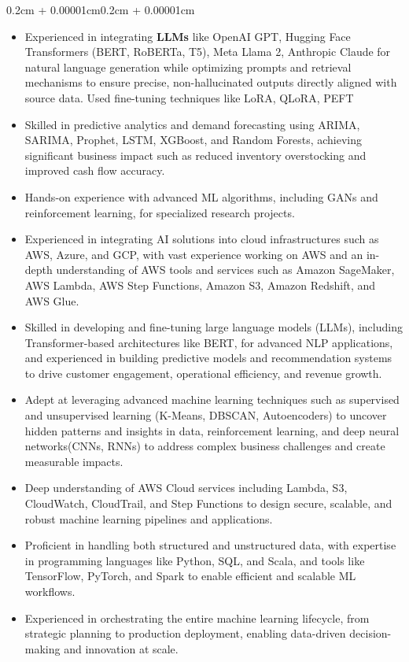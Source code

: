 \documentclass{article}
\newenvironment{highlights}{
    \begin{itemize}[
        topsep=0.10cm, 
        parsep=0.08cm, 
        partopsep=0pt, 
        itemsep=0.08cm, 
        leftmargin=0.4cm + 10pt
    ]
}{
    \end{itemize}
}
\newenvironment{onecolentry}{
    \begin{adjustwidth}{0.2cm + 0.00001cm}{0.2cm + 0.00001cm}
}{
    \end{adjustwidth}
}
\begin{document}
\begin{onecolentry}
\begin{highlights}
        \item Experienced in integrating \textbf{LLMs} like OpenAI GPT, Hugging Face Transformers (BERT, RoBERTa, T5), Meta Llama 2, Anthropic Claude for natural language generation while optimizing prompts and retrieval mechanisms to ensure precise, non-hallucinated outputs directly aligned with source data. Used fine-tuning techniques like LoRA, QLoRA, PEFT
        \item Skilled in predictive analytics and demand forecasting using ARIMA, SARIMA, Prophet, LSTM, XGBoost, and Random Forests, achieving significant business impact such as reduced inventory overstocking and improved cash flow accuracy.
        \item Hands-on experience with advanced ML algorithms, including GANs and reinforcement learning, for specialized research projects.
        \item Experienced in integrating AI solutions into cloud infrastructures such as AWS, Azure, and GCP, with vast experience working on AWS and an in-depth understanding of AWS tools and services such as Amazon SageMaker, AWS Lambda, AWS Step Functions, Amazon S3, Amazon Redshift, and AWS Glue.
        \item Skilled in developing and fine-tuning large language models (LLMs), including Transformer-based architectures like BERT, for advanced NLP applications, and experienced in building predictive models and recommendation systems to drive customer engagement, operational efficiency, and revenue growth.
        \item Adept at leveraging advanced machine learning techniques such as supervised and unsupervised learning (K-Means, DBSCAN, Autoencoders) to uncover hidden patterns and insights in data, reinforcement learning, and deep neural networks(CNNs, RNNs) to address complex business challenges and create measurable impacts.
        \item Deep understanding of AWS Cloud services including Lambda, S3, CloudWatch, CloudTrail, and Step Functions to design secure, scalable, and robust machine learning pipelines and applications.
        \item Proficient in handling both structured and unstructured data, with expertise in programming languages like Python, SQL, and Scala, and tools like TensorFlow, PyTorch, and Spark to enable efficient and scalable ML workflows.
        \item Experienced in orchestrating the entire machine learning lifecycle, from strategic planning to production deployment, enabling data-driven decision-making and innovation at scale.

\end{highlights}
\end{onecolentry}
\end{document}
